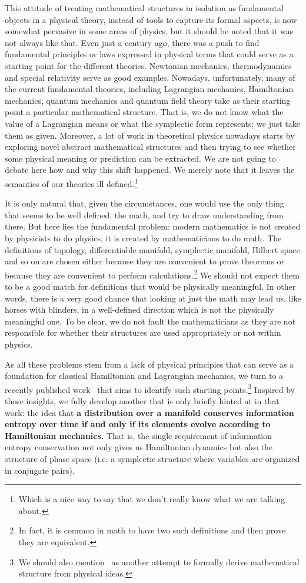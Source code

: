 \documentclass[11pt]{elsarticle}
\begin{document}
This attitude of treating mathematical structures in isolation as fundamental objects in a physical theory, instead of tools to capture its formal aspects, is now somewhat pervasive in some areas of physics, but it should be noted that it was not always like that. Even just a century ago, there was a push to find fundamental principles or laws expressed in physical terms that could serve as a starting point for the different theories. Newtonian mechanics, thermodynamics and special relativity serve as good examples. Nowadays, unfortunately, many of the current fundamental theories, including Lagrangian mechanics, Hamiltonian mechanics, quantum mechanics and quantum field theory take as their starting point a particular mathematical structure. That is, we do not know what the value of a Lagrangian means or what the symplectic form represents; we just take them as given. Moreover, a lot of work in theoretical physics nowadays starts by exploring novel abstract mathematical structures and then trying to see whether some physical meaning or prediction can be extracted. We are not going to debate here how and why this shift happened. We merely note that it leaves the semantics of our theories ill defined.\footnote{Which is a nice way to say that we don't really know what we are talking about.} 

It is only natural that, given the circumstances, one would use the only thing that seems to be well defined, the math, and try to draw understanding from there. But here lies the fundamental problem: modern mathematics is not created by physicists to do physics, it is created by mathematicians to do math. The definitions of topology, differentiable manifold, symplectic manifold, Hilbert space and so on are chosen either because they are convenient to prove theorems or because they are convenient to perform calculations.\footnote{In fact, it is common in math to have two such definitions and then prove they are equivalent.} We should not expect them to be a good match for definitions that would be physically meaningful. In other words, there is a very good chance that looking at just the math may lead us, like horses with blinders, in a well-defined direction which is not the physically meaningful one. To be clear, we do not fault the mathematicians as they are not responsible for whether their structures are used appropriately or not within physics.

As all these problems stem from a lack of physical principles that can serve as a foundation for classical Hamiltonian and Lagrangian mechanics, we turn to a recently published work~\cite{AoPPhy1} that aims to identify such starting points.\footnote{We should also mention~\cite{Maudlin} as another attempt to formally derive mathematical structure from physical ideas.} Inspired by those insights, we fully develop another that is only briefly hinted at in that work: the idea that \textbf{a distribution over a manifold conserves information entropy over time if and only if its elements evolve according to Hamiltonian mechanics.} That is, the single requirement of information entropy conservation not only gives us Hamiltonian dynamics but also the structure of phase space (i.e. a symplectic structure where variables are organized in conjugate pairs).
\end{document}
